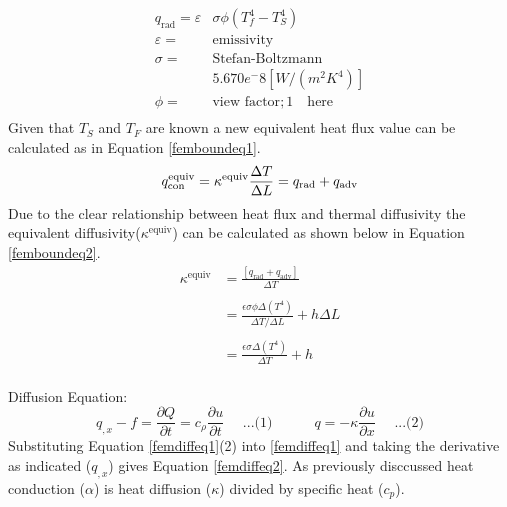 	\begin{equation} %
	       \begin{aligned}
	       q_{\text{rad}} = \varepsilon&\sigma \phi \left(T_f^4 - T_S^4\right)\\
	       \varepsilon =& \text{emissivity}\\
	       \sigma =& \text{Stefan-Boltzmann} \\&5.670 e^-8 [W/(m^2K^4)]\\
	       \phi =& \text{view factor};1 \quad \text{here}\\
	       \end{aligned}
	\end{equation}
	Given that $T_S$ and $T_F$ are known a new equivalent heat flux value can be calculated as in Equation \ref{femboundeq1}.
	\begin{equation} %
	q_{\text{con}}^{\text{equiv}} = \kappa^{\text{equiv}} \frac{\Delta T}{\Delta L} = q_{\text{rad}} + q_{\text{adv}}\\
	\end{equation}
	Due to the clear relationship between heat flux and thermal diffusivity the equivalent diffusivity($\kappa^{\text{equiv}}$) can be calculated as shown below in Equation \ref{femboundeq2}. 
	\begin{equation}%
	\begin{aligned}
	\kappa^{\text{equiv}} &= \frac{\left[q_{\text{rad}} + q_{\text{adv}} \right]}{\Delta T}\\
	&\quad\\
	&= \frac{\epsilon \sigma \phi \Delta \left(T^4\right)}{\Delta T / \Delta L } + h \Delta L\\
	&\quad\\
	&= \frac{\epsilon \sigma \Delta \left(T^4\right)}{\Delta T   } + h\\
	\end{aligned}
	\end{equation}
	
Diffusion Equation: 
	\begin{equation}%
	q_{,x} - f = \frac{\partial Q}{\partial t} = c_{\rho}\frac{\partial u}{\partial t}\quad\text{  ...(1)} \quad\quad\quad q = -\kappa \frac{\partial u}{\partial x}\quad\text{  ...(2)}
\end{equation}
Substituting Equation \ref{femdiffeq1}(2) into \ref{femdiffeq1} and taking the derivative as indicated ($q_{,x}$) gives Equation \ref{femdiffeq2}. 
As previously disccussed heat conduction ($\alpha$) is heat diffusion ($\kappa$)  divided by specific heat ($c_p$).


